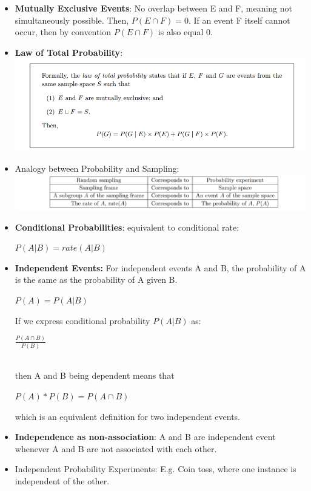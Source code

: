 \documentclass[10pt, landscape]{article}
\begin{document}
\begin{multicols*}{4}
\begin{itemize}
	\item \textbf{Mutually Exclusive Events}: No overlap between E and F, meaning not simultaneously possible. Then, $P(E \cap F) = 0 $. If an event F itself cannot occur, then by convention $P(E \cap F) $ is also equal 0.
	\item \textbf{Law of Total Probability}:
	\includegraphics[width = \linewidth]{lawoftotalprobability}
	\item Analogy between Probability and Sampling:
	\includegraphics[width = \linewidth]{tableanalogy}
	\item \textbf{Conditional Probabilities}: equivalent to conditional rate:
	\centerline {$P ( A \vert B ) = rate ( A \vert B ) $}
	\item \textbf{Independent Events:} For independent events A and B, the probability of A is the same as the probability of A given B.
	\centerline {$P(A) = P(A \vert B)$}
	If we express conditional probability $P(A \vert B)$ as: \\
	\centerline	{$\frac{P(A \cap B)}{P(B)} $} ~\\
	then A and B being dependent means that 
	\centerline {$ P(A) * P(B) = P(A \cap B) $}
	which is an equivalent definition for two independent events.
	\item \textbf{Independence as non-association}: A and B are independent event whenever A and B are not associated with each other.
	\item Independent Probability Experiments: E.g. Coin toss, where one instance is independent of the other.
\end{itemize}


\end{multicols*}
\end{document}
